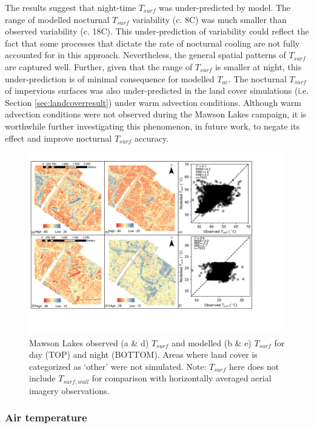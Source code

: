 \documentclass[gmd, manuscript]{copernicus}
\begin{document}
The results suggest that night-time $T_{surf}$ was under-predicted by model. The range of modelled nocturnal $T_{surf}$ variability (c. 8\degree C) was much smaller than observed variability (c. 18\degree C). This under-prediction of variability could reflect the fact that some processes that dictate the rate of nocturnal cooling are not fully accounted for in this approach. Nevertheless, the general spatial patterns of $T_{surf}$ are captured well. Further, given that the  range of $T_{surf}$ is smaller at night, this under-prediction is of minimal consequence for modelled $T_{ac}$. The nocturnal $T_{surf}$ of impervious surfaces was also under-predicted in the land cover simulations (i.e. Section \ref{sec:landcoverresult}) under warm advection conditions. Although warm advection conditions were not observed during the Mawson Lakes campaign, it is worthwhile further investigating this phenomenon, in future work, to negate its effect and improve nocturnal $T_{surf}$ accuracy. 


\begin{figure}
\includegraphics[width=1\textwidth]{figure5.png}
 \caption{Mawson Lakes  observed (a \& d) $T_{surf}$ and modelled (b \& e) $T_{surf}$ for day (TOP) and night (BOTTOM). Areas where land cover is categorized as `other' were not simulated. Note: $T_{surf}$ here does not include $T_{surf,wall}$ for comparison with horizontally averaged aerial imagery observations.} \label{fig:MawsonBase}
\end{figure}

 


\subsubsection*{Air temperature}\label{sec:airtempresult} 
\end{document}
